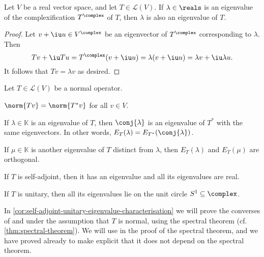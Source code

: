 \documentclass[article, a4paper, 11pt, oneside]{memoir}
\numberwithin{equation}{chapter}
\newcommand{\calL}{\mathcal{L}}
\begin{document}
\begin{lemma}
    \label{lem:complexification-eigenvalue}
    Let $V$ be a real vector space, and let $T \in \calL(V)$. If $\lambda \in \reals$ is an eigenvalue of the complexification $T^\complex$ of $T$, then $\lambda$ is also an eigenvalue of $T$.
\end{lemma}

\begin{proof}
    Let $v + \iu u \in V^\complex$ be an eigenvector of $T^\complex$ corresponding to $\lambda$. Then
    \begin{equation*}
        Tv + \iu Tu
            = T^\complex (v + \iu u)
            = \lambda(v + \iu u)
            = \lambda v + \iu \lambda u.
    \end{equation*}
    It follows that $Tv = \lambda v$ as desired.
\end{proof}


\begin{proposition}
    Let $T \in \calL(V)$ be a normal operator.
    \begin{enumprop}
        \item \label{enum:normal-adjoint-norm} $\norm{Tv} = \norm{T^*v}$ for all $v \in V$.
        
        \item \label{enum:normal-adjoint-eigenvalues} If $\lambda \in \mathbb{K}$ is an eigenvalue of $T$, then $\conj{\lambda}$ is an eigenvalue of $T^*$ with the same eigenvectors. In other words, $E_T(\lambda) = E_{T^*}(\conj{\lambda})$.

        \item \label{enum:normal-orthogonal-eigenspaces} If $\mu \in \mathbb{K}$ is another eigenvalue of $T$ distinct from $\lambda$, then $E_T(\lambda)$ and $E_T(\mu)$ are orthogonal.

        \item \label{enum:self-adjoint-eigenvalues-exists-and-real} If $T$ is self-adjoint, then it has an eigenvalue and all its eigenvalues are real.

        \item \label{enum:unitary-eigenvalues-unit-circle} If $T$ is unitary, then all its eigenvalues lie on the unit circle $S^1 \subseteq \complex$.
    \end{enumprop}
\end{proposition}
%
In \cref{cor:self-adjoint-unitary-eigenvalue-characterisation} we will prove the converses of  and  under the assumption that $T$ is normal, using the spectral theorem (cf. \cref{thm:spectral-theorem}). We will use  in the proof of the spectral theorem, and we have proved  already to make explicit that it does not depend on the spectral theorem.
\end{document}
